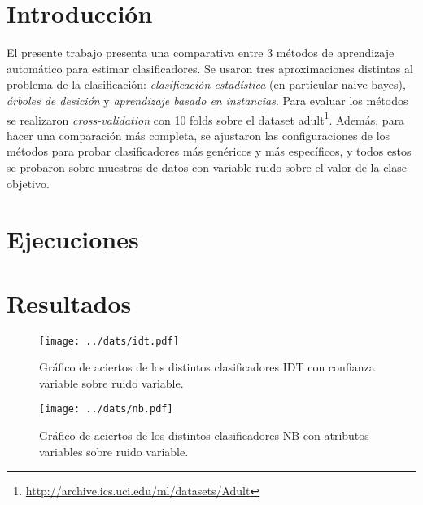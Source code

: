 \documentclass[a4paper,10pt]{article}
\begin{document}



\maketitle
\tableofcontents
\newpage

\section{Introducción}

El presente trabajo presenta una comparativa entre 3 métodos de aprendizaje automático para estimar clasificadores. Se usaron tres aproximaciones distintas al problema de la clasificación: \emph{clasificación estadística} (en particular \textsf{naive bayes}), \emph{árboles de desición} y \emph{aprendizaje basado en instancias}. Para evaluar los métodos se realizaron \emph{cross-validation} con 10 folds sobre el dataset \textsf{adult}\footnote{\url{http://archive.ics.uci.edu/ml/datasets/Adult}}. Además, para hacer una comparación más completa, se ajustaron las configuraciones de los métodos para probar clasificadores más genéricos y más específicos, y todos estos se probaron sobre muestras de datos con variable ruido sobre el valor de la clase objetivo. 


\section{Ejecuciones}

\section{Resultados}

\begin{figure}
\centering
\texttt{[image: ../dats/idt.pdf]}
\caption{Gráfico de aciertos de los distintos clasificadores \textsf{IDT} con confianza variable sobre ruido variable.}
\end{figure}

\begin{figure}
\centering
\texttt{[image: ../dats/nb.pdf]}
\caption{Gráfico de aciertos de los distintos clasificadores \textsf{NB} con atributos variables sobre ruido variable.}
\end{figure}
\end{document}
